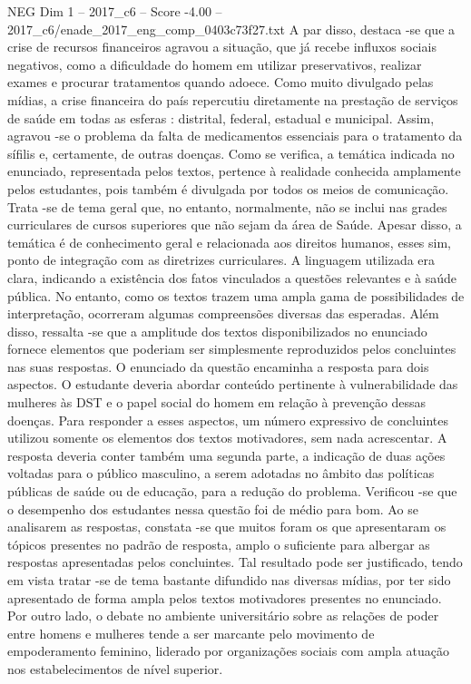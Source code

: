 \begin{textsample}{NEG Dim 1 – 2017\_c6 – Score -4.00 – 2017\_c6/enade\_2017\_eng\_comp\_0403c73f27.txt}
A par disso, destaca -se que a crise de recursos financeiros agravou a situação, que já recebe influxos sociais negativos, como a dificuldade do homem em utilizar preservativos, realizar exames e procurar tratamentos quando adoece.
Como muito divulgado pelas mídias, a crise financeira do país repercutiu diretamente na prestação de serviços de saúde em todas as esferas : distrital, federal, estadual e municipal.
Assim, agravou -se o problema da falta de medicamentos essenciais para o tratamento da sífilis e, certamente, de outras doenças.
Como se verifica, a temática indicada no enunciado, representada pelos textos, pertence à realidade conhecida amplamente pelos estudantes, pois também é divulgada por todos os meios de comunicação.
Trata -se de tema geral que, no entanto, normalmente, não se inclui nas grades curriculares de cursos superiores que não sejam da área de Saúde.
Apesar disso, a temática é de conhecimento geral e relacionada aos direitos humanos, esses sim, ponto de integração com as diretrizes curriculares.
A linguagem utilizada era clara, indicando a existência dos fatos vinculados a questões relevantes e à saúde pública.
No entanto, como os textos trazem uma ampla gama de possibilidades de interpretação, ocorreram algumas compreensões diversas das esperadas.
Além disso, ressalta -se que a amplitude dos textos disponibilizados no enunciado fornece elementos que poderiam ser simplesmente reproduzidos pelos concluintes nas suas respostas.
O enunciado da questão encaminha a resposta para dois aspectos.
O estudante deveria abordar conteúdo pertinente à vulnerabilidade das mulheres às DST e o papel social do homem em relação à prevenção dessas doenças.
Para responder a esses aspectos, um número expressivo de concluintes utilizou somente os elementos dos textos motivadores, sem nada acrescentar.
A resposta deveria conter também uma segunda parte, a indicação de duas ações voltadas para o público masculino, a serem adotadas no âmbito das políticas públicas de saúde ou de educação, para a redução do problema.
Verificou -se que o desempenho dos estudantes nessa questão foi de médio para bom.
Ao se analisarem as respostas, constata -se que muitos foram os que apresentaram os tópicos presentes no padrão de resposta, amplo o suficiente para albergar as respostas apresentadas pelos concluintes.
Tal resultado pode ser justificado, tendo em vista tratar -se de tema bastante difundido nas diversas mídias, por ter sido apresentado de forma ampla pelos textos motivadores presentes no enunciado.
Por outro lado, o debate no ambiente universitário sobre as relações de poder entre homens e mulheres tende a ser marcante pelo movimento de empoderamento feminino, liderado por organizações sociais com ampla atuação nos estabelecimentos de nível superior.

\end{textsample}
